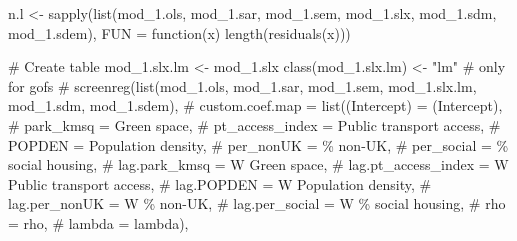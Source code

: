 \documentclass[
  letterpaper,
  DIV=11,
  numbers=noendperiod]{scrreprt}
\newenvironment{Shaded}{\begin{snugshade}}{\end{snugshade}}
\newcommand{\AttributeTok}[1]{\textcolor[rgb]{0.40,0.45,0.13}{#1}}
\newcommand{\CommentTok}[1]{\textcolor[rgb]{0.37,0.37,0.37}{#1}}
\newcommand{\ControlFlowTok}[1]{\textcolor[rgb]{0.00,0.23,0.31}{#1}}
\newcommand{\FunctionTok}[1]{\textcolor[rgb]{0.28,0.35,0.67}{#1}}
\newcommand{\NormalTok}[1]{\textcolor[rgb]{0.00,0.23,0.31}{#1}}
\newcommand{\OtherTok}[1]{\textcolor[rgb]{0.00,0.23,0.31}{#1}}
\newcommand{\StringTok}[1]{\textcolor[rgb]{0.13,0.47,0.30}{#1}}
\begin{document}
\begin{Shaded}
\begin{Highlighting}[]
\NormalTok{n.l }\OtherTok{\textless{}{-}} \FunctionTok{sapply}\NormalTok{(}\FunctionTok{list}\NormalTok{(mod\_1.ols, mod\_1.sar, mod\_1.sem, mod\_1.slx, mod\_1.sdm, mod\_1.sdem),}
       \AttributeTok{FUN =} \ControlFlowTok{function}\NormalTok{(x) }\FunctionTok{length}\NormalTok{(}\FunctionTok{residuals}\NormalTok{(x)))}

\CommentTok{\# Create table}
\NormalTok{mod\_1.slx.lm }\OtherTok{\textless{}{-}}\NormalTok{ mod\_1.slx}
\FunctionTok{class}\NormalTok{(mod\_1.slx.lm) }\OtherTok{\textless{}{-}} \StringTok{"lm"} \CommentTok{\# only for gofs}
\CommentTok{\# screenreg(list(mod\_1.ols, mod\_1.sar, mod\_1.sem, mod\_1.slx.lm, mod\_1.sdm, mod\_1.sdem),}
\CommentTok{\#           custom.coef.map = list(\textquotesingle{}(Intercept)\textquotesingle{} =  \textquotesingle{}(Intercept)\textquotesingle{},}
\CommentTok{\#                                  \textquotesingle{}park\_kmsq\textquotesingle{} =  \textquotesingle{}Green space\textquotesingle{},}
\CommentTok{\#                                  \textquotesingle{}pt\_access\_index\textquotesingle{} =  \textquotesingle{}Public transport access\textquotesingle{},}
\CommentTok{\#                                  \textquotesingle{}POPDEN\textquotesingle{} =  \textquotesingle{}Population density\textquotesingle{},}
\CommentTok{\#                                  \textquotesingle{}per\_nonUK\textquotesingle{} =  \textquotesingle{}\% non{-}UK\textquotesingle{},}
\CommentTok{\#                                  \textquotesingle{}per\_social\textquotesingle{} = \textquotesingle{}\% social housing\textquotesingle{},}
\CommentTok{\#                                  \textquotesingle{}lag.park\_kmsq\textquotesingle{} =  \textquotesingle{}W Green space\textquotesingle{},}
\CommentTok{\#                                  \textquotesingle{}lag.pt\_access\_index\textquotesingle{} =  \textquotesingle{}W Public transport access\textquotesingle{},}
\CommentTok{\#                                  \textquotesingle{}lag.POPDEN\textquotesingle{} =  \textquotesingle{}W Population density\textquotesingle{},}
\CommentTok{\#                                  \textquotesingle{}lag.per\_nonUK\textquotesingle{} =  \textquotesingle{}W \% non{-}UK\textquotesingle{},}
\CommentTok{\#                                  \textquotesingle{}lag.per\_social\textquotesingle{} = \textquotesingle{}W \% social housing\textquotesingle{},}
\CommentTok{\#                                  \textquotesingle{}rho\textquotesingle{} = \textquotesingle{}rho\textquotesingle{},}
\CommentTok{\#                                  \textquotesingle{}lambda\textquotesingle{} = \textquotesingle{}lambda\textquotesingle{}),}

\end{Highlighting}
\end{Shaded}
\end{document}
